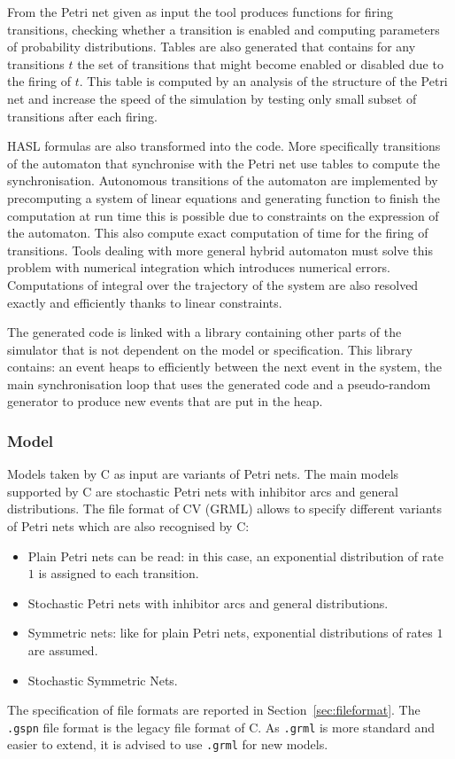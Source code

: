 \documentclass{article}
\newcommand{\cosmos}{\mbox{\textup{C}\scalebox{0.75}{{\textsc{OSMOS}}}}}
\newcommand{\cosyverif}{\mbox{\textup{C}\scalebox{0.75}{{\textsc{OSY}}}\textup{V}\scalebox{0.75}{{\textsc{ERIF}}}}}
\begin{document}
From the Petri net given as input the tool produces functions for
firing transitions, checking whether a transition is enabled and
computing parameters of probability distributions. Tables are also
generated that contains for any transitions $t$ the set of transitions
that might become enabled or disabled due to the firing of $t$. This
table is computed by an analysis of the structure of the Petri net
and increase the speed of the simulation by testing only small subset of
transitions after each firing.

HASL formulas are also transformed into the code. More specifically
transitions of the automaton that synchronise with the Petri net use
tables to compute the synchronisation. Autonomous transitions of the
automaton are implemented by precomputing a system of linear equations
and generating function to finish the computation at run time this is
possible due to constraints on the expression of the automaton. This
also compute exact computation of time for the firing of
transitions. Tools dealing with more general hybrid automaton must
solve this problem with numerical integration which introduces
numerical errors. Computations of integral over the trajectory of the
system are also resolved exactly and efficiently thanks to linear
constraints.

The generated code is linked with a library containing other parts
of the simulator that is not dependent on the model or specification.
This library contains: an event heaps to efficiently between the next event
in the system, the main synchronisation loop that uses the generated code
and a pseudo-random generator to produce new events that are put in the heap.

\subsubsection{Model}
Models taken by \cosmos{} as input are variants of Petri nets.  The main
models supported by \cosmos{} are stochastic Petri nets with inhibitor
arcs and general distributions. The file format of \cosyverif{} (GRML) 
allows to specify different variants of Petri nets which are also 
recognised by \cosmos{}:
\begin{itemize}
\item Plain Petri nets can be read: in this case, an exponential
  distribution of rate $1$ is assigned to each transition.
\item Stochastic Petri nets with inhibitor arcs and general distributions.
\item Symmetric nets: like for plain Petri nets, exponential
  distributions of rates $1$ are assumed.
\item Stochastic Symmetric Nets. 
\end{itemize}
The specification of file formats are reported in Section~\ref{sec:fileformat}.
The \verb|.gspn| file format is the legacy file format of \cosmos{}. As \verb|.grml|
is more standard and easier to extend, it is advised to use \verb|.grml| for new
models.
\end{document}
